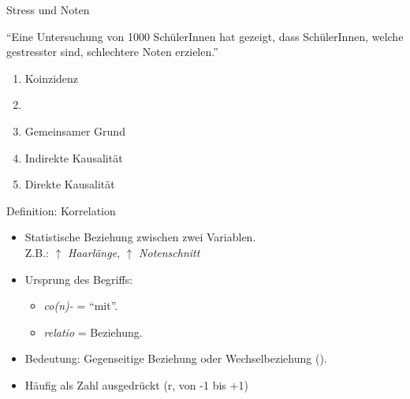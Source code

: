\begin{frame}{Stress und Noten}
    \begin{center}
        \enquote{Eine Untersuchung von 1000 SchülerInnen hat gezeigt, dass SchülerInnen, welche gestresster sind, schlechtere Noten erzielen.}
    \end{center}
    \begin{enumerate}
        \item Koinzidenz
        \item {}
        \item Gemeinsamer Grund
        \item Indirekte Kausalität
        \item Direkte Kausalität
    \end{enumerate}
\end{frame}

\begin{frame}{Definition: Korrelation}
    \begin{mydefinition}[Korrelation]
    \begin{itemize}[<+->]
        \item Statistische Beziehung zwischen zwei Variablen.\\
              Z.B.: $\uparrow$ \textit{Haarlänge}, $\uparrow$ \textit{Notenschnitt}
        \item Ursprung des Begriffs:
              \begin{itemize}
                  \item \textit{co(n)-} = \enquote{mit}.
                  \item \textit{relatio} = Beziehung.
              \end{itemize}
        \item Bedeutung: Gegenseitige Beziehung oder Wechselbeziehung ().
        \item Häufig als Zahl ausgedrückt (r, von -1 bis +1)
    \end{itemize}
    \end{mydefinition}
\end{frame}

